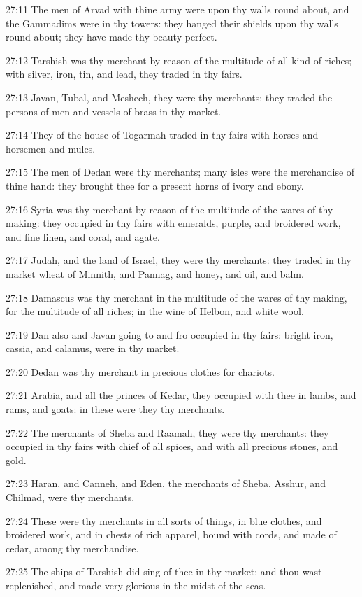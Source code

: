 27:11 The men of Arvad with thine army were upon thy walls round about, and the Gammadims were in thy towers: they hanged their shields upon thy walls round about; they have made thy beauty perfect.

27:12 Tarshish was thy merchant by reason of the multitude of all kind of riches; with silver, iron, tin, and lead, they traded in thy fairs.

27:13 Javan, Tubal, and Meshech, they were thy merchants: they traded the persons of men and vessels of brass in thy market.

27:14 They of the house of Togarmah traded in thy fairs with horses and horsemen and mules.

27:15 The men of Dedan were thy merchants; many isles were the merchandise of thine hand: they brought thee for a present horns of ivory and ebony.

27:16 Syria was thy merchant by reason of the multitude of the wares of thy making: they occupied in thy fairs with emeralds, purple, and broidered work, and fine linen, and coral, and agate.

27:17 Judah, and the land of Israel, they were thy merchants: they traded in thy market wheat of Minnith, and Pannag, and honey, and oil, and balm.

27:18 Damascus was thy merchant in the multitude of the wares of thy making, for the multitude of all riches; in the wine of Helbon, and white wool.

27:19 Dan also and Javan going to and fro occupied in thy fairs: bright iron, cassia, and calamus, were in thy market.

27:20 Dedan was thy merchant in precious clothes for chariots.

27:21 Arabia, and all the princes of Kedar, they occupied with thee in lambs, and rams, and goats: in these were they thy merchants.

27:22 The merchants of Sheba and Raamah, they were thy merchants: they occupied in thy fairs with chief of all spices, and with all precious stones, and gold.

27:23 Haran, and Canneh, and Eden, the merchants of Sheba, Asshur, and Chilmad, were thy merchants.

27:24 These were thy merchants in all sorts of things, in blue clothes, and broidered work, and in chests of rich apparel, bound with cords, and made of cedar, among thy merchandise.

27:25 The ships of Tarshish did sing of thee in thy market: and thou wast replenished, and made very glorious in the midst of the seas.

